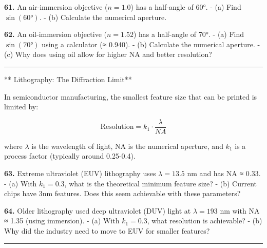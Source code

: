 \documentclass[
  11pt,
]{article}
\begin{document}
\textbf{61.} An air-immersion objective (\(n = 1.0\)) has a half-angle
of 60°. - (a) Find \(\sin(60°)\). - (b) Calculate the numerical
aperture.

\textbf{62.} An oil-immersion objective (\(n = 1.52\)) has a half-angle
of 70°. - (a) Find \(\sin(70°)\) using a calculator (≈ 0.940). - (b)
Calculate the numerical aperture. - (c) Why does using oil allow for
higher NA and better resolution?

\begin{center}\rule{0.5\linewidth}{0.5pt}\end{center}

** Lithography: The Diffraction Limit**

In semiconductor manufacturing, the smallest feature size that can be
printed is limited by:

\[\text{Resolution} = k_1 \cdot \frac{\lambda}{NA}\]

where \(\lambda\) is the wavelength of light, NA is the numerical
aperture, and \(k_1\) is a process factor (typically around 0.25-0.4).

\textbf{63.} Extreme ultraviolet (EUV) lithography uses
\(\lambda = 13.5\) nm and has NA ≈ 0.33. - (a) With \(k_1 = 0.3\), what
is the theoretical minimum feature size? - (b) Current chips have 3nm
features. Does this seem achievable with these parameters?

\textbf{64.} Older lithography used deep ultraviolet (DUV) light at
\(\lambda = 193\) nm with NA ≈ 1.35 (using immersion). - (a) With
\(k_1 = 0.3\), what resolution is achievable? - (b) Why did the industry
need to move to EUV for smaller features?

\begin{center}\rule{0.5\linewidth}{0.5pt}\end{center}
\end{document}
